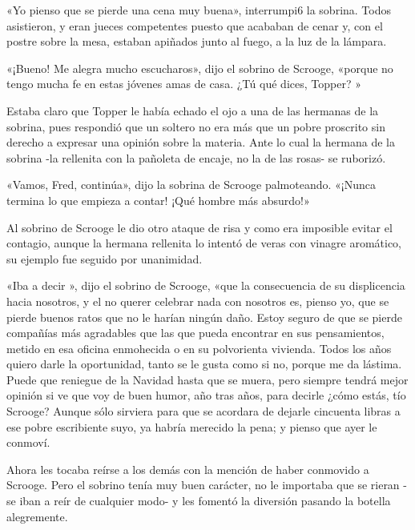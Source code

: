 \documentclass{novela}
\begin{document}
 «Yo pienso que se pierde una cena muy buena», interrumpi6 la sobrina. Todos asistieron, y eran jueces competentes puesto que acababan de cenar y, con el postre sobre la mesa, estaban apiñados junto al fuego, a la luz de la lámpara.

 «¡Bueno! Me alegra mucho escucharos», dijo el sobrino de Scrooge, «porque no tengo mucha fe en estas jóvenes amas de casa. ¿Tú qué dices, Topper? »

 Estaba claro que Topper le había echado el ojo a una de las hermanas de la sobrina, pues respondió que un soltero no era más que un pobre proscrito sin derecho a expresar una opinión sobre la materia. Ante lo cual la hermana de la sobrina -la rellenita con la pañoleta de encaje, no la de las rosas- se ruborizó.

 «Vamos, Fred, continúa», dijo la sobrina de Scrooge palmoteando. «¡Nunca termina lo que empieza a contar! ¡Qué hombre más absurdo!»

 Al sobrino de Scrooge le dio otro ataque de risa y como era imposible evitar el contagio, aunque la hermana rellenita lo intentó de veras con vinagre aromático, su ejemplo fue seguido por unanimidad.

 «Iba a decir », dijo el sobrino de Scrooge, «que la consecuencia de su displicencia hacia nosotros, y el no querer celebrar nada con nosotros es, pienso yo, que se pierde buenos ratos que no le harían ningún daño. Estoy seguro de que se pierde compañías más agradables que las que pueda encontrar en sus pensamientos, metido en esa oficina enmohecida o en su polvorienta vivienda. Todos los años quiero darle la oportunidad, tanto se le gusta como si no, porque me da lástima. Puede que reniegue de la Navidad hasta que se muera, pero siempre tendrá mejor opinión si ve que voy de buen humor, año tras años, para decirle ¿cómo estás, tío Scrooge? Aunque sólo sirviera para que se acordara de dejarle cincuenta libras a ese pobre escribiente suyo, ya habría merecido la pena; y pienso que ayer le conmoví.

 Ahora les tocaba reírse a los demás con la mención de haber conmovido a Scrooge. Pero el sobrino tenía muy buen carácter, no le importaba que se rieran -se iban a reír de cualquier modo- y les fomentó la diversión pasando la botella alegremente.
\end{document}
